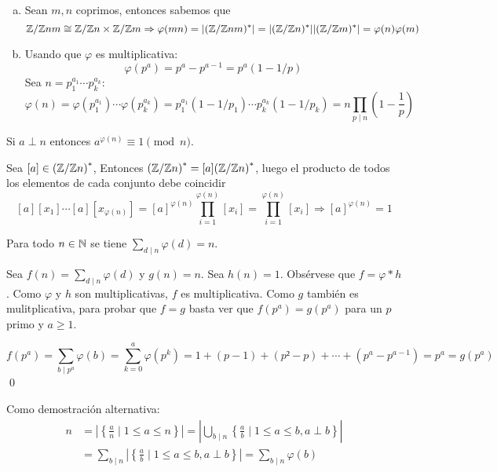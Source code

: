 \documentclass[TAN.tex]{subfiles}
\begin{document}
\begin{dem}
\begin{enumerate}[(a)]
\item Sean $m,n$ coprimos, entonces sabemos que 
$$
\mathbb{Z}/\mathbb{Z} nm \cong \mathbb{Z}/\mathbb{Z} n \times \mathbb{Z}/\mathbb{Z} m \Rightarrow \varphi(mn)= |(\mathbb{Z}/\mathbb{Z} nm)^*| = |(\mathbb{Z}/\mathbb{Z} n)^*||(\mathbb{Z}/\mathbb{Z} m)^*| = \varphi(n)\varphi(m)
$$

\item Usando que $φ$ es multiplicativa:
\[ φ(p^a) = p^a - p^{a-1} = p^a(1-1/p) \]
Sea $n = p_1^{a_1}\cdots p_k^{a_k}$:
\[ φ(n) = φ(p_1^{a_1})\cdots φ(p_k^{a_k}) = p_1^{a_1}(1-1/p_1)\cdots p_k^{a_k}(1-1/p_k) = n \prod_{p\mid n} \left(1-\dfrac{1}{p}\right)\]
\end{enumerate}
\QED
\end{dem}

\begin{teorema}
Si $a \perp n$ entonces $a^{φ(n)} \equiv 1 \pmod n$.
\end{teorema}
\begin{dem}
Sea $[a]\in {\left(\mathbb{Z}/\mathbb{Z}n\right)^\ast}$, Entonces ${\left(\mathbb{Z}/\mathbb{Z} n\right)^\ast} = [a]{\left(\mathbb{Z}/\mathbb{Z}n\right)^\ast}$, luego el producto de todos los elementos de cada conjunto debe coincidir
$$
[a][x_1]\cdots[a][x_{\varphi(n)}] = [a]^{\varphi(n)}\prod_{i=1}^{\varphi(n)} [x_i] = \prod_{i=1}^{\varphi(n)} [x_i] \Rightarrow [a]^{\varphi(n)} = 1
$$
\end{dem}
\begin{prop}
Para todo $n \in \mathbb{N}$ se tiene $\displaystyle\sum_{d\mid n} φ(d) = n$.
\end{prop}

\begin{dem}
Sea $f(n) = \sum_{d\mid n} φ(d)$ y $g(n) = n$. Sea $h(n) = 1$. Obsérvese que $f = φ * h$. Como $φ$ y $h$ son multiplicativas, $f$ es multiplicativa. Como $g$ también es mulitplicativa, para probar que $f = g$ basta ver que $f(p^a)=g(p^a)$ para un $p$ primo y $a ≥ 1$.

\[ f(p^a) = \sum_{b\mid p^a} φ(b) = \sum_{k=0}^a φ(p^k) = 1+(p-1)+(p²-p)+\cdots+(p^a-p^{a-1}) = p^a = g(p^a) \]
\qed

Como demostración alternativa:
\begin{align*}
n&= \left|\left\{\frac{a}{n} \mid 1 ≤ a ≤ n\right\}\right|
= \left|\bigcup_{b\mid n} \left\{\frac{a}{b} \mid 1≤a≤b, a \perp b\right\}\right|\\
&=\sum_{b\mid n} \left|\left\{\frac{a}{b} \mid 1 ≤ a ≤ b, a \perp b\right\}\right|
= \sum_{b\mid n} φ(b) 
\end{align*} \QED
\end{dem}
\end{document}
